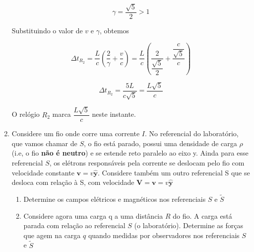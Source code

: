 \documentclass[10pt,a4paper]{article}
\begin{document}
\begin{enumerate}
	\begin{equation*}
		\gamma = \dfrac{\sqrt{5}}{2} > 1
	\end{equation*}
	
	Substituindo o valor de $ v $ e $ \gamma $, obtemos
	
	\begin{equation*}
		\Delta t_{R_2}  = \dfrac{L}{c} (\dfrac{2}{\gamma} + \dfrac{v}{c}) = \dfrac{L}{c} (\dfrac{2}{ \dfrac{\sqrt{5}}{2}} + \dfrac{\dfrac{c}{\sqrt{5}}}{c})
	\end{equation*}

	\begin{equation*}
		\Delta t_{R_2}  = \dfrac{5L}{c\sqrt{5}} = \dfrac{L\sqrt{5}}{c}
	\end{equation*}

	O relógio $ R_2 $ marca $\dfrac{L\sqrt{5}}{c}  $ neste instante.
	
	\item Considere um fio onde corre uma corrente $I$. No referencial do laboratório, que vamos chamar de $S$, o fio está parado, possui uma densidade de carga $\rho$ (i.e, o fio \textbf{não é neutro}) e se estende reto paralelo ao eixo y. Ainda para esse referencial $S$, os elétrons responsáveis pela corrente se deslocam pelo fio com velocidade constante $\mathbf{v} =v \mathbf{\hat{y}}$. Considere também um outro referencial S que se desloca com relação à S, com velocidade $\mathbf{V} = \mathbf{v} = v\mathbf{\hat{y}}$
	\begin{enumerate}
	\item Determine os campos elétricos e magnéticos nos referenciais $S$ e $\tilde{S}$
	
	\item Considere agora uma carga q a uma distância $R$ do fio. A carga está parada com relação ao referencial $S$ (o laboratório). Determine as forças que agem na carga $q$ quando medidas por observadores nos referenciais $S$ e $\tilde{S}$
	\end{enumerate}
	\end{enumerate}
\end{document}

